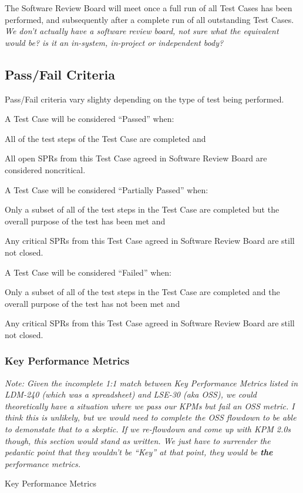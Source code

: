 
The Software Review Board will meet once a full run of all Test Cases has been performed, and subsequently after a complete run of all outstanding Test Cases. \textit{We don't actually have a software review board, not sure what the equivalent would be? is it an in-system, in-project or independent body?}


\subsection{Pass/Fail Criteria}

Pass/Fail criteria vary slighty depending on the type of test being performed.


A Test Case will be considered ``Passed'' when:
\begin{itemize_single}
\item All of the test steps of the Test Case are completed and
\item All open SPRs from this Test Case agreed in Software Review Board are considered noncritical.
\end{itemize_single}

A Test Case will be considered ``Partially Passed'' when:
\begin{itemize_single}
\item Only a subset of all of the test steps in the Test Case are completed but the overall purpose of the test has been met and
\item Any critical SPRs from this Test Case agreed in Software Review Board are still not closed.
\end{itemize_single}

A Test Case will be considered ``Failed'' when:
\begin{itemize_single}
\item Only a subset of all of the test steps in the Test Case are completed and the overall purpose of the test has not been met and
\item Any critical SPRs from this Test Case agreed in Software Review Board are still not closed.
\end{itemize_single}

\subsubsection{Key Performance Metrics}

\textit{Note: Given the incomplete 1:1 match between Key Performance Metrics listed in LDM-240 (which was a spreadsheet) and LSE-30 (aka OSS), we could theoretically have a situation where we pass our KPMs but fail an OSS metric. I think this is unlikely, but we would need to complete the OSS flowdown to be able to demonstate that to a skeptic. If we re-flowdown and come up with KPM 2.0s though, this section would stand as written. We just have to surrender the pedantic point that they wouldn't be ``Key'' at that point, they would be \textbf{the} performance metrics.}

Key Performance Metrics 








